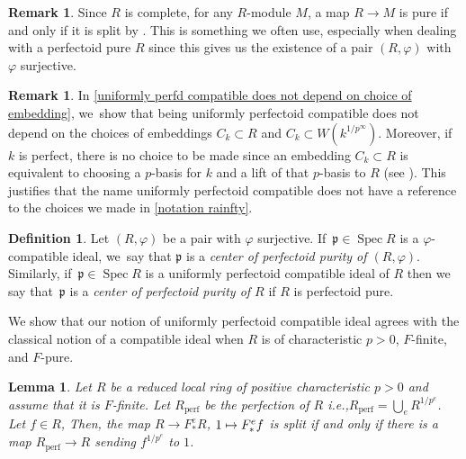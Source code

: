 \documentclass[11pt]{article}
\newcommand{\ie}{i.e.,\xspace}
\let\autoref\cref
\newcommand\mto{\mathchoice{\longmapsto}{\mapsto}{\mapsto}{\mapsto}}
\theoremstyle{plain}
\newtheorem{lemma}[theorem]{Lemma}
\theoremstyle{definition}
\newtheorem{definition}[theorem]{Definition}
\newtheorem{remark}[theorem]{Remark}
\numberwithin{equation}{theorem}
\newcommand{\p}{\mathfrak{p}}
\newcommand{\perf}{_{\mathrm{perf}}}
\DeclareMathOperator{\Spec}{{Spec}}
\newcommand{\unpe}{{1/{p^e}}}
\newcommand{\fe}{F^e}
\newcommand{\fstare}{\fe_*}
\renewcommand{\phi}{\varphi}
\newcommand{\rphi}{(R,\phi)}
\newcommand{\unpfty}{{1/p^\infty}}
\begin{document}
\begin{remark}
Since $R$ is complete, for any $R$\nobreakdash-module $M$, a map $R\to M$ is pure if and only if it is split by \cite[Lem.\,1.2]{FedderFPureRat}. This is something we often use, especially when dealing with a perfectoid pure $R$ since this gives us the existence of a pair $\rphi$ with $\phi$ surjective.
\end{remark}
\begin{remark}
In \autoref{uniformly perfd compatible does not depend on choice of embedding}, we~show that being uniformly perfectoid compatible does not depend on the choices of embeddings $C_k\subset R$ and $C_k\subset W(k^\unpfty)$. Moreover, if~$k$ is perfect, there is no choice to be made since an embedding $C_k\subset R$ is equivalent to choosing a $p$-basis for $k$ and a lift of that $p$-basis to $R$ (see \cite[Th.\,23]{HochsterStructureCompleteLocalRings}).
This justifies that the name uniformly perfectoid compatible does not have a reference to the choices we made in \autoref{notation rainfty}.
\end{remark}

\begin{definition}
Let $\rphi$ be a pair with $\phi$ surjective. If~$\p\in \Spec R$ is a $\phi$\nobreakdash-compatible ideal, we~say that $\p$ is a \emph{center of perfectoid purity of $\rphi$}.
Similarly, if~$\p\in \Spec R$ is a uniformly perfectoid compatible ideal of $R$ then we say that~$\p$ is a \emph{center of perfectoid purity of $R$} if $R$ is perfectoid pure.
\end{definition}

We show that our notion of uniformly perfectoid compatible ideal agrees with the classical notion of a compatible ideal when $R$ is of characteristic $p>0$, $F$-finite, and $F$-pure.
\begin{lemma}\label{lemma splitting from perfection}
Let $R$ be a reduced local ring of positive characteristic $p>0$ and assume that it is $F$-finite. Let $R\perf$ be the perfection of $R$ \ie $R\perf=\bigcup_e R^\unpe$. Let $f\in R$,
Then, the map $R\to\fstare R$, $1\mto \fstare f$
is split if and only if there is a map $R\perf\to R$ sending $f^\unpe$ to $1$.
\end{lemma}
\end{document}
